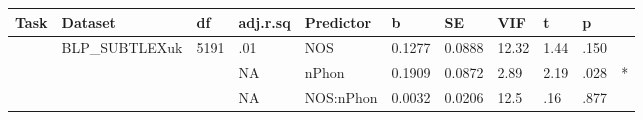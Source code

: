 \begin{table}[ht]
\centering
\begingroup\normalsize
\begin{tabular}{lllllllllll}
  \hline
Task & Dataset & df & adj.r.sq & Predictor & b & SE & VIF & t & p &  \\ 
  \hline
 & BLP\_SUBTLEXuk & 5191 & .01 & NOS & 0.1277 & 0.0888 & 12.32 & 1.44 & .150 &   \\ 
   &  &  & NA & nPhon & 0.1909 & 0.0872 & 2.89 & 2.19 & .028 & * \\ 
   &  &  & NA & NOS:nPhon & 0.0032 & 0.0206 & 12.5 & .16 & .877 &   \\ 
   \hline
\end{tabular}
\endgroup
\end{table}
